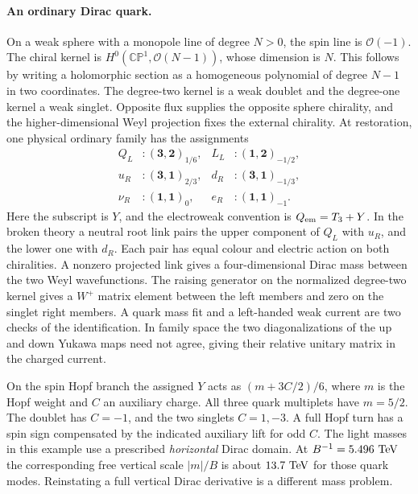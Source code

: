 \documentclass[10pt]{article}
\theoremstyle{definition}
\begin{document}
\paragraph{An ordinary Dirac quark.} On a weak sphere with a monopole line of degree \(N>0\), the spin line is \(\mathcal O(-1)\). The chiral kernel is \(H^0(\mathbb{CP}^1,\mathcal O(N-1))\), whose dimension is \(N\). This follows by writing a holomorphic section as a homogeneous polynomial of degree \(N-1\) in two coordinates. The degree-two kernel is a weak doublet and the degree-one kernel a weak singlet. Opposite flux supplies the opposite sphere chirality, and the higher-dimensional Weyl projection fixes the external chirality. At restoration, one physical ordinary family has the assignments
\begin{equation}
 \begin{aligned}
 Q_L&:(\mathbf3,\mathbf2)_{1/6},&
 L_L&:(\mathbf1,\mathbf2)_{-1/2},\\
 u_R&:(\mathbf3,\mathbf1)_{2/3},&
 d_R&:(\mathbf3,\mathbf1)_{-1/3},\\
 \nu_R&:(\mathbf1,\mathbf1)_{0},&
 e_R&:(\mathbf1,\mathbf1)_{-1}.
 \end{aligned}
 \label{eq:summer-family}
\end{equation}
Here the subscript is \(Y\), and the electroweak convention is \(Q_{\rm em}=T_3+Y\). In the broken theory a neutral root link pairs the upper component of \(Q_L\) with \(u_R\), and the lower one with \(d_R\). Each pair has equal colour and electric action on both chiralities. A nonzero projected link gives a four-dimensional Dirac mass between the two Weyl wavefunctions. The raising generator on the normalized degree-two kernel gives a \(W^+\) matrix element between the left members and zero on the singlet right members. A quark mass fit and a left-handed weak current are two checks of the identification. In family space the two diagonalizations of the up and down Yukawa maps need not agree, giving their relative unitary matrix in the charged current.

On the spin Hopf branch the assigned \(Y\) acts as \((m+3C/2)/6\), where \(m\) is the Hopf weight and \(C\) an auxiliary charge. All three quark multiplets have \(m=5/2\). The doublet has \(C=-1\), and the two singlets \(C=1,-3\). A full Hopf turn has a spin sign compensated by the indicated auxiliary lift for odd \(C\). The light masses in this example use a prescribed \emph{horizontal} Dirac domain. At \(B^{-1}=5.496\ {\rm TeV}\) the corresponding free vertical scale \(|m|/B\) is about \(13.7\ {\rm TeV}\) for those quark modes. Reinstating a full vertical Dirac derivative is a different mass problem.
\end{document}
